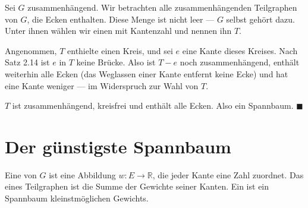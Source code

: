 \begin{merksatz}
Sei $G$ zusammenhängend. Wir betrachten alle zusammenhängenden Teilgraphen von $G$, die  Ecken enthalten. Diese Menge ist nicht leer --- $G$ selbst gehört dazu. Unter ihnen wählen wir einen mit  Kantenzahl und nennen ihn $T$.

Angenommen, $T$ enthielte einen Kreis, und sei $e$ eine Kante dieses Kreises. Nach Satz 2.14 ist $e$ in $T$ keine Brücke. Also ist $T - e$ noch zusammenhängend, enthält weiterhin alle Ecken (das Weglassen einer Kante entfernt keine Ecke) und hat eine Kante weniger --- im Widerspruch zur Wahl von $T$.

$T$ ist zusammenhängend, kreisfrei und enthält alle Ecken. Also ein Spannbaum. $\blacksquare$

\begin{center}
\begin{minipage}{0.88\textwidth}
\end{minipage}
\end{center}
\end{merksatz}

\section{Der günstigste Spannbaum}

\begin{definition}
Eine  von $G$ ist eine Abbildung $w : E \to \mathbb{R}$, die jeder Kante eine Zahl zuordnet. Das  eines Teilgraphen ist die Summe der Gewichte seiner Kanten. Ein  ist ein Spannbaum kleinstmöglichen Gewichts.
\end{definition}

